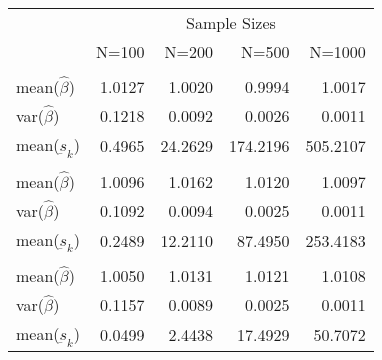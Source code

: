 
\begin{tabular}{lrrrr}
\toprule
\multicolumn{1}{c}{ } & \multicolumn{4}{c}{Sample Sizes} \\
\cmidrule(l{3pt}r{3pt}){2-5}
  & N=100 & N=200 & N=500 & N=1000\\
\midrule
\addlinespace[0.3em]
\multicolumn{5}{l}{\textbf{$ \rho = 0 $  }}\\
\hspace{1em}mean($\hat{\beta}$) & 1.0127 & 1.0020 & 0.9994 & 1.0017\\
\hspace{1em}var($\hat{\beta}$) & 0.1218 & 0.0092 & 0.0026 & 0.0011\\
\hspace{1em}mean($\underbar{s}_k$) & 0.4965 & 24.2629 & 174.2196 & 505.2107\\
\addlinespace[0.3em]
\multicolumn{5}{l}{\textbf{$ \rho = 0.5 $}}\\
\hspace{1em}mean($\hat{\beta}$) & 1.0096 & 1.0162 & 1.0120 & 1.0097\\
\hspace{1em}var($\hat{\beta}$) & 0.1092 & 0.0094 & 0.0025 & 0.0011\\
\hspace{1em}mean($\underbar{s}_k$) & 0.2489 & 12.2110 & 87.4950 & 253.4183\\
\addlinespace[0.3em]
\multicolumn{5}{l}{\textbf{$ \rho = 0.9 $}}\\
\hspace{1em}mean($\hat{\beta}$) & 1.0050 & 1.0131 & 1.0121 & 1.0108\\
\hspace{1em}var($\hat{\beta}$) & 0.1157 & 0.0089 & 0.0025 & 0.0011\\
\hspace{1em}mean($\underbar{s}_k$) & 0.0499 & 2.4438 & 17.4929 & 50.7072\\
\bottomrule
\end{tabular}
